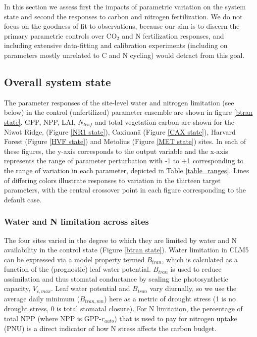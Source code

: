 \documentclass[draft,linenumbers]{agujournal}
\begin{document}
In this section we assess first the impacts of parametric variation on the system state and second the responses to carbon and nitrogen fertilization. We do not focus on the goodness of fit to observations, because our aim is to discern the primary parametric controls over CO$_{2}$ and N fertilization responses, and including extensive data-fitting and calibration experiments (including on parameters mostly unrelated to C and N cycling) would detract from this goal. 

\subsection{Overall system state}
The parameter responses of the site-level water and nitrogen limitation (see below) in the control (unfertilized) parameter ensemble are shown in figure \ref{btran state}. GPP, NPP, LAI, $N_{leaf}$ and total vegetation carbon are shown for the Niwot Ridge, (Figure \ref{NR1 state}), Caxiuan\~a (Figure \ref{CAX state}), Harvard Forest (Figure \ref{HVF state}) and Metolius (Figure \ref{MET state}) sites. In each of these figures, the y-axis corresponds to the output variable and the x-axis represents the range of parameter perturbation with -1 to +1 corresponding to the range of variation in each parameter, depicted in Table \ref{table_ranges}. Lines of differing colors illustrate responses to variation in the thirteen target parameters, with the central crossover point in each figure corresponding to the default case.

\subsubsection{Water and N limitation across sites}
The four sites varied in the degree to which they are limited by water and N availability in the control state (Figure \ref{btran state}). Water limitation in CLM5 can be expressed via a model property termed $B_{tran}$, which is calculated as a function of the (prognostic) leaf water potential. $B_{tran}$  is used to reduce assimilation and thus stomatal conductance by scaling the photosynthetic capacity, $V_{c,max}$. Leaf water potential and $B_{tran}$ vary diurnally, so we use the average daily minimum ($B_{tran,mn}$) here as a metric of drought stress (1 is no drought stress, 0 is total stomatal closure). For N limitation, the percentage of total NPP (where NPP is GPP-$r_{auto}$) that is used to pay for nitrogen uptake (PNU) is a direct indicator of how N stress affects the carbon budget. 
\end{document}
